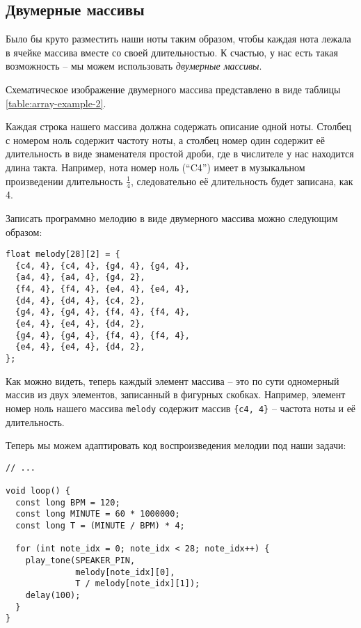 \documentclass[../sparc.tex]{subfiles}
\begin{document}
\newpage
\subsection{Двумерные массивы}

Было бы круто разместить наши ноты таким образом, чтобы каждая нота лежала в
ячейке массива вместе со своей длительностью. К счастью, у нас есть такая
возможность -- мы можем использовать \emph{двумерные массивы}.

Схематическое изображение двумерного массива представлено в виде таблицы
\ref{table:array-example-2}.


Каждая строка нашего массива должна содержать описание одной ноты. Столбец с
номером ноль содержит частоту ноты, а столбец номер один содержит её
длительность в виде знаменателя простой дроби, где в числителе у нас находится
длина такта. Например, нота номер ноль (``C4'') имеет в музыкальном произведении
длительность $\frac{1}{4}$, следовательно её длительность будет записана, как 4.

Записать программно мелодию в виде двумерного массива можно следующим образом:

\begin{verbatim}
float melody[28][2] = {
  {c4, 4}, {c4, 4}, {g4, 4}, {g4, 4},
  {a4, 4}, {a4, 4}, {g4, 2},
  {f4, 4}, {f4, 4}, {e4, 4}, {e4, 4},
  {d4, 4}, {d4, 4}, {c4, 2},
  {g4, 4}, {g4, 4}, {f4, 4}, {f4, 4},
  {e4, 4}, {e4, 4}, {d4, 2},
  {g4, 4}, {g4, 4}, {f4, 4}, {f4, 4},
  {e4, 4}, {e4, 4}, {d4, 2},
};
\end{verbatim}

Как можно видеть, теперь каждый элемент массива -- это по сути одномерный массив
из двух элементов, записанный в фигурных скобках. Например, элемент номер ноль
нашего массива \texttt{melody} содержит массив \texttt{\{c4, 4\}} -- частота ноты
и её длительность.

Теперь мы можем адаптировать код воспроизведения мелодии под наши задачи:

\begin{verbatim}
// ...

void loop() {
  const long BPM = 120;
  const long MINUTE = 60 * 1000000;
  const long T = (MINUTE / BPM) * 4;

  for (int note_idx = 0; note_idx < 28; note_idx++) {
    play_tone(SPEAKER_PIN,
              melody[note_idx][0],
              T / melody[note_idx][1]);
    delay(100);
  }
}
\end{verbatim}
\end{document}
